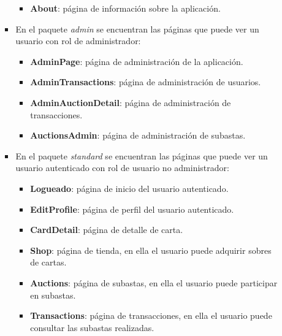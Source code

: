\begin{itemize}
\begin{itemize}
\begin{itemize}
\begin{itemize}
                \item \textbf{About}: página de información sobre la aplicación.
            \end{itemize}
             \item En el paquete \textit{admin} se encuentran las páginas que puede ver un usuario con rol de administrador:
            \begin{itemize}
                \item \textbf{AdminPage}: página de administración de la aplicación.
                \item \textbf{AdminTransactions}: página de administración de usuarios.
                \item \textbf{AdminAuctionDetail}: página de administración de transacciones.
                \item \textbf{AuctionsAdmin}: página de administración de subastas.
            \end{itemize}
            \item En el paquete \textit{standard} se encuentran las páginas que puede ver un usuario autenticado con rol de usuario no administrador:
            \begin{itemize}
                \item \textbf{Logueado}: página de inicio del usuario autenticado.
                \item \textbf{EditProfile}: página de perfil del usuario autenticado.
                \item \textbf{CardDetail}: página de detalle de carta.
                \item \textbf{Shop}: página de tienda, en ella el usuario puede adquirir sobres de cartas.
                \item \textbf{Auctions}: página de subastas, en ella el usuario puede participar en subastas.
                \item \textbf{Transactions}: página de transacciones, en ella el usuario puede consultar las subastas realizadas.
            \end{itemize}
        \end{itemize}
    \end{itemize}
\end{itemize}
